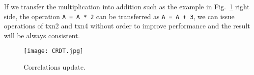 If we transfer the multiplication into addition such as the example in Fig.~\ref{fig:crdt} right side, the operation \texttt{A = A * 2} can be transferred as \texttt{A = A + 3}, we can issue operations of txn2 and txn4 without order to improve performance and the result will be always consistent.
\begin{figure}[htbp]
  \centering
  \texttt{[image: CRDT.jpg]}\\
  \caption{Correlations update.}\label{fig:crdt}
\end{figure}
\fi
